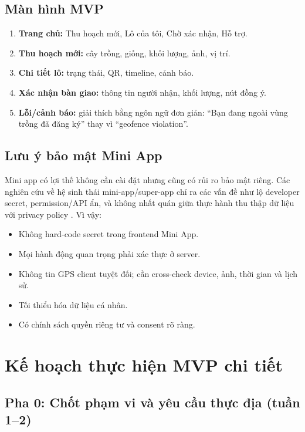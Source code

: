 \documentclass[12pt,a4paper]{article}
\begin{document}
\subsection{Màn hình MVP}

\begin{enumerate}[leftmargin=2em]
    \item \textbf{Trang chủ:} Thu hoạch mới, Lô của tôi, Chờ xác nhận, Hỗ trợ.
    \item \textbf{Thu hoạch mới:} cây trồng, giống, khối lượng, ảnh, vị trí.
    \item \textbf{Chi tiết lô:} trạng thái, QR, timeline, cảnh báo.
    \item \textbf{Xác nhận bàn giao:} thông tin người nhận, khối lượng, nút đồng ý.
    \item \textbf{Lỗi/cảnh báo:} giải thích bằng ngôn ngữ đơn giản: ``Bạn đang ngoài vùng trồng đã đăng ký'' thay vì ``geofence violation''.
\end{enumerate}

\subsection{Lưu ý bảo mật Mini App}

Mini app có lợi thế không cần cài đặt nhưng cũng có rủi ro bảo mật riêng. Các nghiên cứu về hệ sinh thái mini-app/super-app chỉ ra các vấn đề như lộ developer secret, permission/API ẩn, và không nhất quán giữa thực hành thu thập dữ liệu với privacy policy \cite{miniapp_secret,miniapp_privacy}. Vì vậy:

\begin{itemize}[leftmargin=2em]
    \item Không hard-code secret trong frontend Mini App.
    \item Mọi hành động quan trọng phải xác thực ở server.
    \item Không tin GPS client tuyệt đối; cần cross-check device, ảnh, thời gian và lịch sử.
    \item Tối thiểu hóa dữ liệu cá nhân.
    \item Có chính sách quyền riêng tư và consent rõ ràng.
\end{itemize}

\section{Kế hoạch thực hiện MVP chi tiết}

\subsection{Pha 0: Chốt phạm vi và yêu cầu thực địa (tuần 1--2)}
\end{document}
